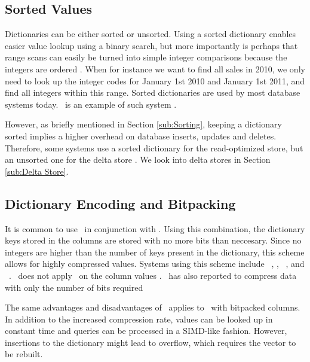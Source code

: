 \subsection{Sorted Values}
\label{sub:Sorted Values}
Dictionaries can be either sorted or unsorted. Using a sorted dictionary enables easier value lookup using a binary search, but more importantly is perhaps that range scans can easily be turned into simple integer comparisons because the integers are ordered \cite{Faust2015-ke}. When for instance we want to find all sales in 2010, we only need to look up the integer codes for January 1st 2010 and January 1st 2011, and find all integers within this range. Sorted dictionaries are used by most database systems today. \saph~is an example of such system \cite{Farber2012-vh}.

However, as briefly mentioned in Section \ref{sub:Sorting}, keeping a dictionary sorted implies a higher overhead on database inserts, updates and deletes. Therefore, some systems use a sorted dictionary for the read-optimized store, but an unsorted one for the delta store \cite{Plattner2014-fr}.  We look into delta stores in Section \ref{sub:Delta Store}.

\subsection{Dictionary Encoding and Bitpacking}
\label{sub:Dictionary Encoding and Bitpacking}
It is common to use \de~in conjunction with \bp. Using this combination, the dictionary keys stored in the columns are stored with no more bits than neccesary. Since no integers are higher than the number of keys present in the dictionary, this scheme allows for highly compressed values. Systems using this scheme include \ibm~\cite{Raman2013-em}, \blink \cite{Barber2012-xt}, \sapnw~\cite{Willhalm2009-hu}, and \saph~\cite{Psaroudakis2014-ma}. \mssql~does not apply \bp~on the column values \cite{Larson2013-mc}. \qlikview~has also reported to compress data with only the number of bits required \cite{Qlik2014-vd}

The same advantages and disadvantages of \bp~applies to \de~with bitpacked columns. In addition to the increased compression rate, values can be looked up in constant time and queries can be processed in a SIMD-like fashion. However, insertions to the dictionary might lead to overflow, which requires the vector to be rebuilt.


